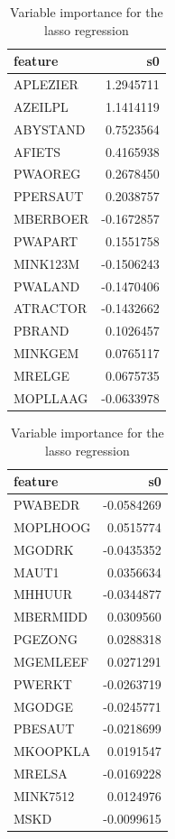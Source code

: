 \documentclass[
  12pt,
  oneside]{report}
\begin{document}
\begin{table}[H]
\caption{\label{tab:unnamed-chunk-23}Variable importance for the lasso regression}

\centering
\fontsize{9}{11}\selectfont
\begin{tabular}[t]{l|r}
\hline
feature & s0\\
\hline
APLEZIER & 1.2945711\\
\hline
AZEILPL & 1.1414119\\
\hline
ABYSTAND & 0.7523564\\
\hline
AFIETS & 0.4165938\\
\hline
PWAOREG & 0.2678450\\
\hline
PPERSAUT & 0.2038757\\
\hline
MBERBOER & -0.1672857\\
\hline
PWAPART & 0.1551758\\
\hline
MINK123M & -0.1506243\\
\hline
PWALAND & -0.1470406\\
\hline
ATRACTOR & -0.1432662\\
\hline
PBRAND & 0.1026457\\
\hline
MINKGEM & 0.0765117\\
\hline
MRELGE & 0.0675735\\
\hline
MOPLLAAG & -0.0633978\\
\hline
\end{tabular}
\centering
\begin{tabular}[t]{l|r}
\hline
feature & s0\\
\hline
PWABEDR & -0.0584269\\
\hline
MOPLHOOG & 0.0515774\\
\hline
MGODRK & -0.0435352\\
\hline
MAUT1 & 0.0356634\\
\hline
MHHUUR & -0.0344877\\
\hline
MBERMIDD & 0.0309560\\
\hline
PGEZONG & 0.0288318\\
\hline
MGEMLEEF & 0.0271291\\
\hline
PWERKT & -0.0263719\\
\hline
MGODGE & -0.0245771\\
\hline
PBESAUT & -0.0218699\\
\hline
MKOOPKLA & 0.0191547\\
\hline
MRELSA & -0.0169228\\
\hline
MINK7512 & 0.0124976\\
\hline
MSKD & -0.0099615\\
\hline
\end{tabular}
\end{table}


\singlespacing %
\end{document}
